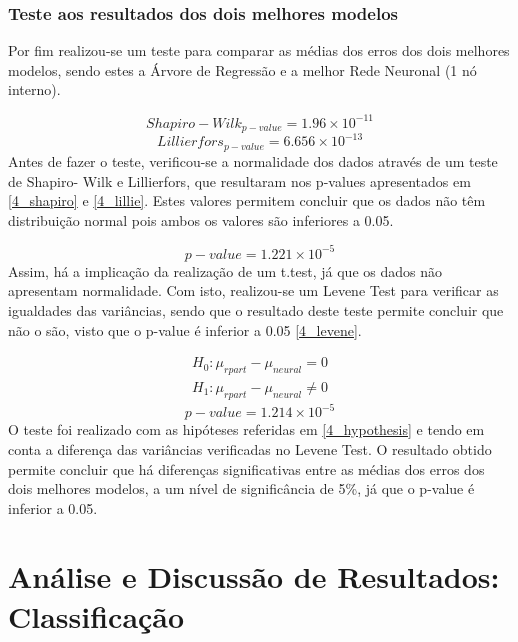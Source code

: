 \documentclass[conference]{IEEEtran}
\begin{document}
\subsubsection{Teste aos resultados dos dois melhores modelos}
Por fim realizou-se um teste para comparar as médias dos erros dos dois melhores modelos, sendo estes a Árvore de Regressão e a melhor Rede Neuronal (1 nó interno).

\begin{equation}
Shapiro-Wilk_{p-value}=1.96\times 10^{-11}\label{4_shapiro}
\end{equation}
\begin{equation}
Lillierfors_{p-value}=6.656\times 10^{-13}\label{4_lillie}
\end{equation}
Antes de fazer o teste, verificou-se a normalidade dos dados através de um teste de Shapiro- Wilk e Lillierfors, que resultaram nos p-values apresentados em \eqref{4_shapiro} e \eqref{4_lillie}. Estes valores permitem concluir que os dados não têm distribuição normal pois ambos os valores são inferiores a 0.05.

\begin{equation}
p-value=1.221\times 10^{-5}\label{4_levene}
\end{equation}
Assim, há a implicação da realização de um t.test, já que os dados não apresentam normalidade. Com isto, realizou-se um Levene Test para verificar as igualdades das variâncias, sendo que o resultado deste teste permite concluir que não o são, visto que o p-value é inferior a 0.05 \eqref{4_levene}.

\begin{equation}
  \begin{array}{l}
    H_{0}:\mu _{rpart} - \mu _{neural}=0 \\ 
    H_{1}:\mu _{rpart} - \mu _{neural}\neq 0
  \end{array}\label{4_hypothesis}
\end{equation}
\begin{equation}
p-value=1.214\times 10^{-5}\label{4_ttest}
\end{equation}
O teste foi realizado com as hipóteses referidas em \eqref{4_hypothesis} e tendo em conta a diferença das variâncias verificadas no Levene Test. O resultado obtido permite concluir que há diferenças significativas entre as médias dos erros dos dois melhores modelos, a um nível de significância de 5\%, já que o p-value é inferior a 0.05.



\section{Análise e Discussão de Resultados: Classificação} 
\label{classification} %
\end{document}
